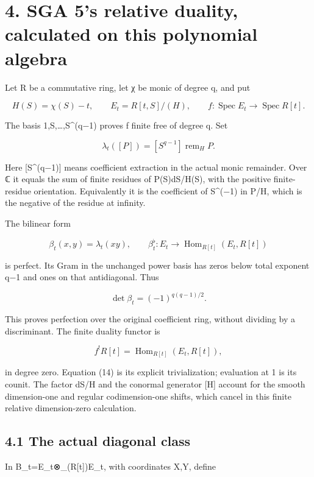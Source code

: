 \documentclass[
  11pt,
]{article}
\begin{document}
\section{4. SGA 5's relative duality, calculated on this polynomial
algebra}\label{sga-5s-relative-duality-calculated-on-this-polynomial-algebra}

Let R be a commutative ring, let χ be monic of degree q, and put

\[
H(S)=\chi(S)-t,\qquad E_t=R[t,S]/(H),\qquad
f:\operatorname{Spec}E_t\longrightarrow\operatorname{Spec}R[t].
\tag{12}
\]

The basis 1,S,\ldots,S\^{}(q−1) proves f finite free of degree q. Set

\[
\lambda_t([P])=[S^{q-1}]\operatorname{rem}_{H}P.
\tag{13}
\]

Here {[}S\^{}(q−1){]} means coefficient extraction in the actual monic
remainder. Over ℂ it equals the sum of finite residues of P(S)dS/H(S),
with the positive finite-residue orientation. Equivalently it is the
coefficient of S\^{}(−1) in P/H, which is the negative of the residue at
infinity.

The bilinear form

\[
\beta_t(x,y)=\lambda_t(xy),\qquad
\beta_t^\flat:E_t\longrightarrow\operatorname{Hom}_{R[t]}(E_t,R[t])
\tag{14}
\]

is perfect. Its Gram in the unchanged power basis has zeros below total
exponent q−1 and ones on that antidiagonal. Thus

\[
\det\beta_t=(-1)^{q(q-1)/2}.
\tag{15}
\]

This proves perfection over the original coefficient ring, without
dividing by a discriminant. The finite duality functor is

\[
f^!R[t]=\operatorname{Hom}_{R[t]}(E_t,R[t]),
\tag{16}
\]

in degree zero. Equation (14) is its explicit trivialization; evaluation
at 1 is its counit. The factor dS/H and the conormal generator {[}H{]}
account for the smooth dimension-one and regular codimension-one shifts,
which cancel in this finite relative dimension-zero calculation.

\subsection{4.1 The actual diagonal
class}\label{the-actual-diagonal-class}

In B\_t=E\_t⊗\_(R{[}t{]})E\_t, with coordinates X,Y, define
\end{document}
